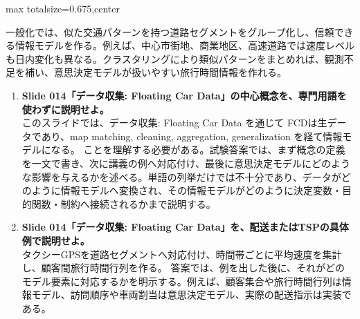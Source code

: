 \begin{adjustbox}{max totalsize={\textwidth}{0.675\textheight},center}
\begin{minipage}{\textwidth}
\begin{minipage}[t]{0.485\textwidth}
一般化では、似た交通パターンを持つ道路セグメントをグループ化し、信頼できる情報モデルを作る。例えば、中心市街地、商業地区、高速道路では速度レベルも日内変化も異なる。クラスタリングにより類似パターンをまとめれば、観測不足を補い、意思決定モデルが扱いやすい旅行時間情報を作れる。\par
{}
\begin{enumerate}
\item \textbf{Slide 014「データ収集: Floating Car Data」の中心概念を、専門用語を使わずに説明せよ。}\\このスライドでは、データ収集: Floating Car Data を通じて FCDは生データであり、map matching, cleaning, aggregation, generalization を経て情報モデルになる。 ことを理解する必要がある。試験答案では、まず概念の定義を一文で書き、次に講義の例へ対応付け、最後に意思決定モデルにどのような影響を与えるかを述べる。単語の列挙だけでは不十分であり、データがどのように情報モデルへ変換され、その情報モデルがどのように決定変数・目的関数・制約へ接続されるかまで説明する。
\item \textbf{Slide 014「データ収集: Floating Car Data」を、配送またはTSPの具体例で説明せよ。}\\タクシーGPSを道路セグメントへ対応付け、時間帯ごとに平均速度を集計し、顧客間旅行時間行列を作る。 答案では、例を出した後に、それがどのモデル要素に対応するかを明示する。例えば、顧客集合や旅行時間行列は情報モデル、訪問順序や車両割当は意思決定モデル、実際の配送指示は実装である。
\end{enumerate}
\end{minipage}
\end{minipage}
\end{adjustbox}

